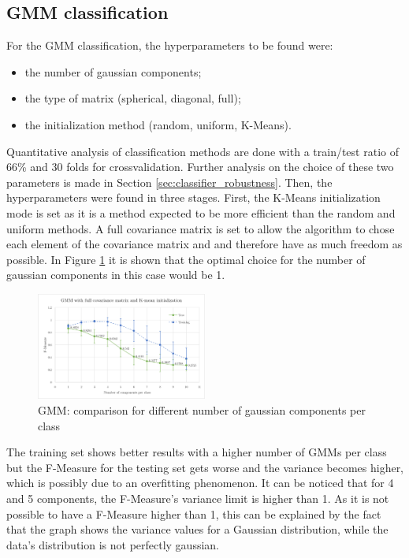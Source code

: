 \documentclass[a4paper,10pt]{article}
\begin{document}
\subsection{GMM classification}
For the GMM classification, the hyperparameters to be found were:

\begin{itemize}
  \item the number of gaussian components;
  \item the type of matrix (spherical, diagonal, full);
  \item the initialization method (random, uniform, K-Means).
\end{itemize}

 
 Quantitative analysis of classification methods are done with a train/test ratio of 66\% and 30 folds for crossvalidation. Further analysis on the choice of these two parameters is made in Section \ref{sec:classifier_robustness}. Then, the hyperparameters were found in three stages. First, the K-Means initialization mode is set as it is a method expected to be more efficient than the random and uniform methods. A full covariance matrix is set to allow the algorithm to chose each element of the covariance matrix and and therefore have as much freedom as possible. In Figure \ref{fig:GMM_graph_1} it is shown that the optimal choice for the number of gaussian components in this case would be 1.


\begin{figure}[H]
	\centering
	\includegraphics[width=0.5\textwidth]{pictures/GMM_graph_1}
	\caption{GMM: comparison for different number of gaussian components per class}
	\label{fig:GMM_graph_1}
\end{figure}

The training set shows better results with a higher number of GMMs per class but the F-Measure for the testing set gets worse and the variance becomes higher, which is possibly due to an overfitting phenomenon.
It can be noticed that for 4 and 5 components, the F-Measure's variance limit is higher than 1. As it is not possible to have a F-Measure higher than 1, this can be explained by the fact that the graph shows the variance values for a Gaussian distribution, while the data's distribution is not perfectly gaussian.
\end{document}
